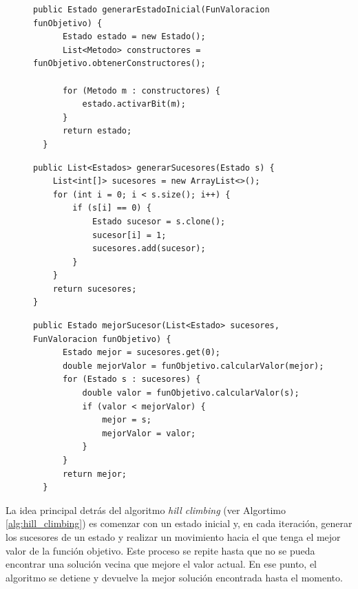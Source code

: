 \begin{figure}[H]
  \begin{lstlisting}[style=javaStyle, caption={Algoritmo para generar el estado inicial}, label={alg:generar_estado_inicial}]
  public Estado generarEstadoInicial(FunValoracion funObjetivo) {
      Estado estado = new Estado();
      List<Metodo> constructores = funObjetivo.obtenerConstructores();
      
      for (Metodo m : constructores) {
          estado.activarBit(m);
      }
      return estado;
  }
  \end{lstlisting}
  \end{figure}

\begin{figure}[H]
\begin{lstlisting}[style=javaStyle, caption={Algoritmo para generar los sucesores}, label={alg:sucessores}]
public List<Estados> generarSucesores(Estado s) {
    List<int[]> sucesores = new ArrayList<>();  
    for (int i = 0; i < s.size(); i++) {
        if (s[i] == 0) {
            Estado sucesor = s.clone();
            sucesor[i] = 1;
            sucesores.add(sucesor);
        }
    }
    return sucesores;
}
\end{lstlisting}
\end{figure}

\begin{figure}[H]
  \begin{lstlisting}[style=javaStyle, caption={Algoritmo para encontrar el mejor sucesor}, label={alg:mejor_sucesor}]
  public Estado mejorSucesor(List<Estado> sucesores, FunValoracion funObjetivo) {
      Estado mejor = sucesores.get(0);
      double mejorValor = funObjetivo.calcularValor(mejor);
      for (Estado s : sucesores) {
          double valor = funObjetivo.calcularValor(s);
          if (valor < mejorValor) {
              mejor = s;
              mejorValor = valor;
          }
      }
      return mejor;
  }
  \end{lstlisting}
  \end{figure}

La idea principal detrás del algoritmo \emph{hill climbing} (ver Algortimo \ref{alg:hill_climbing}) es comenzar con un estado inicial y, en cada iteración, generar los sucesores de un estado y realizar un movimiento hacia el que tenga el mejor valor de la función objetivo. Este proceso se repite hasta que no se pueda encontrar una solución vecina que mejore el valor actual. En ese punto, el algoritmo se detiene y devuelve la mejor solución encontrada hasta el momento. 



